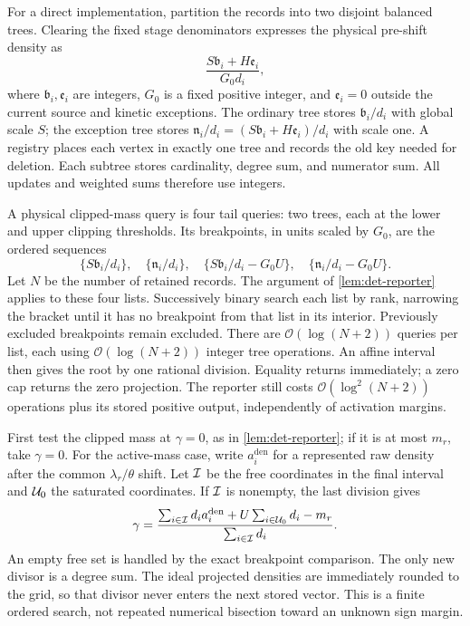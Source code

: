 For a direct implementation, partition the records into two disjoint
balanced trees. Clearing the fixed stage denominators expresses the physical
pre-shift density as
\begin{equation*}
 \frac{S\mathfrak b_i+H\mathfrak e_i}{G_0d_i},
\end{equation*}
where $\mathfrak b_i,\mathfrak e_i$ are integers, $G_0$ is a fixed
positive integer, and $\mathfrak e_i=0$ outside the current source and
kinetic exceptions. The ordinary tree stores $\mathfrak b_i/d_i$ with
global scale $S$; the exception tree stores
$\mathfrak n_i/d_i=(S\mathfrak b_i+H\mathfrak e_i)/d_i$ with scale one.
A registry places each vertex in exactly one tree and records the old key
needed for deletion. Each subtree stores cardinality, degree sum, and
numerator sum. All updates and weighted sums therefore use integers.

A physical clipped-mass query is four tail queries: two trees, each at
the lower and upper clipping thresholds. Its breakpoints, in units scaled
by $G_0$, are the ordered sequences
\[
 \{S\mathfrak b_i/d_i\},\quad\{\mathfrak n_i/d_i\},
 \quad\{S\mathfrak b_i/d_i-G_0U\},
 \quad\{\mathfrak n_i/d_i-G_0U\}.
\]
Let $N$ be the number of retained records. The argument of
\cref{lem:det-reporter} applies to these four lists.
Successively binary search each list by rank, narrowing the bracket until
it has no breakpoint from that list in its interior. Previously excluded
breakpoints remain excluded. There are $\mathcal{O}(\log(N+2))$ queries per list,
each using $\mathcal{O}(\log(N+2))$ integer tree operations. An affine interval
then gives the root by one rational division. Equality returns immediately;
a zero cap returns the zero projection. The reporter still costs
$\mathcal{O}(\log^2(N+2))$ operations plus its stored positive output, independently
of activation margins.

First test the clipped mass at $\gamma=0$, as in \cref{lem:det-reporter};
if it is at most $m_r$, take $\gamma=0$. For the active-mass case,
write $a_i^{\mathrm{den}}$ for a represented raw density after the common
$\lambda_r/\theta$ shift. Let $\mathcal{I}$ be the free coordinates in the final
interval and $\mathcal{U}_0$ the saturated coordinates. If $\mathcal{I}$ is nonempty, the
last division gives
\begin{equation*}
 \gamma=\frac{\sum_{i\in\mathcal{I}}d_i a_i^{\mathrm{den}}
               +U\sum_{i\in\mathcal{U}_0}d_i-m_r}
              {\sum_{i\in\mathcal{I}}d_i}.
\end{equation*}
An empty free set is handled by the exact breakpoint comparison.
The only new divisor is a degree sum. The ideal projected densities are
immediately rounded to the grid, so that divisor never enters the next
stored vector. This is a finite ordered search, not repeated numerical
bisection toward an unknown sign margin.

